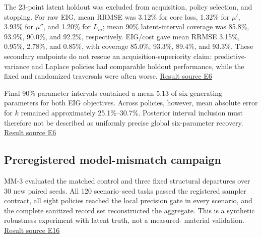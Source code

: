 The 23-point latent holdout was excluded from acquisition, policy
selection, and stopping. For raw EIG, mean RRMSE was 3.12\% for core
loss, 1.32\% for \(\mu'\), 3.93\% for \(\mu''\), and 1.20\% for \(L_m\);
mean 90\% latent-interval coverage was 85.8\%, 93.9\%, 90.0\%, and
92.2\%, respectively. EIG/cost gave mean RRMSE 3.15\%, 0.95\%, 2.78\%,
and 0.85\%, with coverage 85.0\%, 93.3\%, 89.4\%, and 93.3\%. These
secondary endpoints do not rescue an acquisition-superiority claim:
predictive-variance and Laplace policies had comparable holdout
performance, while the fixed and randomized traversals were often worse.
\href{https://github.com/hoangduong6210/EIG-bayesian-for-Recover-potential-Physical-Parameter-of-MagComponent/blob/a3e6326621d90123e5661c17e2d562fb0f5e0a41/wiki/evidence/Evidence-Sources.md\#e6}{Result
source E6}

Final 90\% parameter intervals contained a mean 5.13 of six generating
parameters for both EIG objectives. Across policies, however, mean
absolute error for \(k\) remained approximately 25.1\%--30.7\%.
Posterior interval inclusion must therefore not be described as
uniformly precise global six-parameter recovery.
\href{https://github.com/hoangduong6210/EIG-bayesian-for-Recover-potential-Physical-Parameter-of-MagComponent/blob/a3e6326621d90123e5661c17e2d562fb0f5e0a41/wiki/evidence/Evidence-Sources.md\#e6}{Result
source E6}

\hypertarget{preregistered-model-mismatch-campaign}{%
\subsection{Preregistered model-mismatch
campaign}\label{preregistered-model-mismatch-campaign}}

MM-3 evaluated the matched control and three fixed structural departures
over 30 new paired seeds. All 120 scenario--seed tasks passed the
registered sampler contract, all eight policies reached the local
precision gate in every scenario, and the complete sanitized record set
reconstructed the aggregate. This is a synthetic robustness experiment
with latent truth, not a measured- material validation.
\href{https://github.com/hoangduong6210/EIG-bayesian-for-Recover-potential-Physical-Parameter-of-MagComponent/blob/a3e6326621d90123e5661c17e2d562fb0f5e0a41/wiki/evidence/Evidence-Sources.md\#e16}{Result
source E16}

